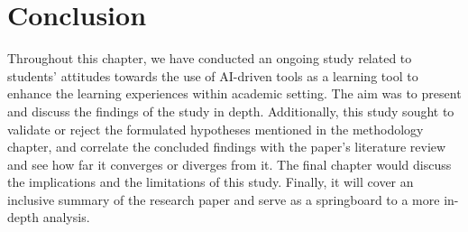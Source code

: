 \section{Conclusion}
Throughout this chapter, we have conducted an ongoing study related to students’
attitudes towards the use of AI-driven tools as a learning tool to enhance the learning experiences
within academic setting. The aim was to present and discuss the findings of the study in depth.
Additionally, this study sought to validate or reject the formulated hypotheses mentioned
in the methodology chapter, and correlate the concluded findings with the paper’s literature
review and see how far it converges or diverges from it. The final chapter would discuss
the implications and the limitations of this study. Finally, it will cover an inclusive summary
of the research paper and serve as a springboard to a more in-depth analysis.
